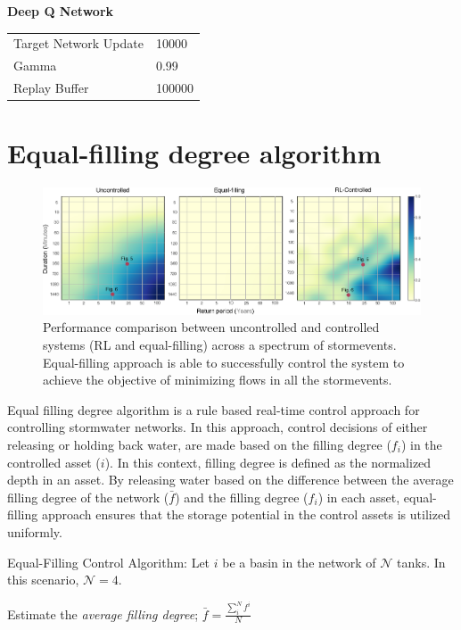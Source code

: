 \noindent\textbf{Deep Q Network}
\begin{table}[H]
\begin{tabular}{ll}
\toprule
Target Network Update                     & 10000  \\
Gamma & 0.99\\
Replay Buffer & 100000 \\
\bottomrule
\end{tabular}
\end{table}


\section{Equal-filling degree algorithm}\label{SI:equalfill}

\begin{figure}[H]
	\includegraphics[width=\linewidth]{gfx/Chapter-3/heatmap_eq.eps}
	\caption{Performance comparison between uncontrolled and controlled systems (RL and equal-filling) across a spectrum of stormevents. Equal-filling approach is able to successfully control the system to achieve the objective of minimizing flows in all the stormevents.}\label{fig:11}
\end{figure}


Equal filling degree algorithm is a rule based real-time control approach for controlling stormwater networks.
In this approach, control decisions of either releasing or holding back water, are made based on the filling degree (${f}_i$) in the controlled asset ($i$).
In this context, filling degree is defined as the normalized depth in an asset.
By releasing water based on the difference between the average filling degree of the network ($\bar{f}$) and the filling degree (${f}_i$) in each asset, equal-filling approach ensures that the storage potential in the control assets is utilized uniformly.  

\begin{algorithm}
	\caption{Equal-Filling Control Algorithm: Let $i$ be a basin in the network of $\mathcal{N}$ tanks. In this scenario, $\mathcal{N} = 4$.}\label{efd}
Estimate the \textit{average filling degree}; $\bar{f} = \frac{\sum^N_i f^i}{N}$\\
\end{algorithm}

